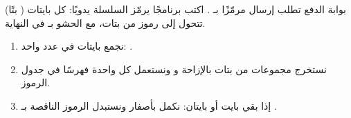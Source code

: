 \begin{statement}
بوابة الدفع تطلب إرسال  مرمّزًا بـ \textbf{}. اكتب برنامجًا يرمّز السلسلة يدويًا: كل  بايتات ( بتًا) تتحول إلى  رموز من  بتات، مع الحشو بـ \code{=} في النهاية.
\end{statement}
\begin{stepsbox}\begin{enumerate}
\item نجمع  بايتات في عدد واحد: .
\item نستخرج  مجموعات من  بتات بالإزاحة و  ونستعمل كل واحدة فهرسًا في جدول الرموز.
\item إذا بقي بايت أو بايتان: نكمل بأصفار ونستبدل الرموز الناقصة بـ \code{=}.
\end{enumerate}\end{stepsbox}
